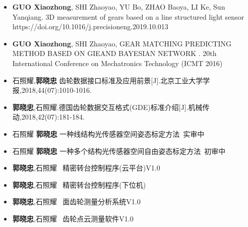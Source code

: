 %
%



\begin{itemize}
	\item \textbf{GUO Xiaozhong}, SHI Zhaoyao, YU Bo, ZHAO Baoya, LI Ke, Sun Yanqiang. 3D measurement of gears based on a line structured light sensor https://doi.org/10.1016/j.precisioneng.2019.10.013\\
	 { \footnotesize {}} 
	 \item \textbf{GUO Xiaozhong}, SHI Zhaoyao, GEAR MATCHING PREDICTING METHOD BASED ON GIEAND BAYESIAN NETWORK .	20th International Conference on Mechatronics Technology (ICMT 2016)\\
	 { \footnotesize {}}
	 \item 石照耀,\textbf{郭晓忠} 齿轮数据接口标准及应用前景[J].北京工业大学学报,2018,44(07):1010-1016.	\\
	 { \footnotesize {}}
	\item \textbf{郭晓忠},石照耀.德国齿轮数据交互格式(GDE)标准介绍[J].机械传动,2018,42(07):181-184.\\
	 { \footnotesize {}}
	\item 石照耀 \textbf{郭晓忠}  一种线结构光传感器空间姿态标定方法\ 实审中\\
	 { \footnotesize {}}
	 \item 石照耀 \textbf{郭晓忠}  一种多个结构光传感器空间自由姿态标定方法\ 初审中\\
	 { \footnotesize {}}
	\item \textbf{郭晓忠},石照耀 \ 精密转台控制程序(云平台)V1.0 \\
	 { \footnotesize {}}
	 \item \textbf{郭晓忠},石照耀 \ 精密转台控制程序(下位机) \\
	 { \footnotesize {}}
	 \item \textbf{郭晓忠},石照耀  \ 面齿轮测量分析系统V1.0 \\
	 { \footnotesize {}}
	 \item \textbf{郭晓忠},石照耀 \  齿轮点云测量软件V1.0 \\
	 { \footnotesize {}}
\end{itemize}